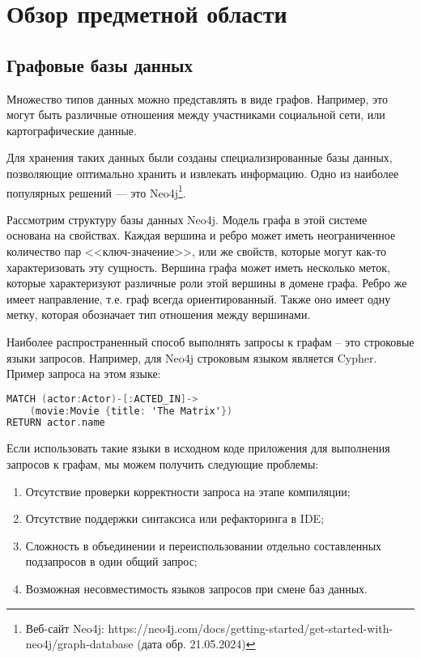 \chapter{Обзор предметной области}
\label{ch:ch1}

\section{Графовые базы данных}
Множество типов данных можно представлять в виде графов.
Например, это могут быть различные отношения между участниками социальной сети, или картографические данные.

Для хранения таких данных были созданы специализированные базы данных, позволяющие оптимально хранить и извлекать информацию. Одно из наиболее популярных решений --- это Neo4j\footnote{Веб-сайт Neo4j: https://neo4j.com/docs/getting-started/get-started-with-neo4j/graph-database (дата обр. 21.05.2024)}.

Рассмотрим структуру базы данных Neo4j.
Модель графа в этой системе основана на свойствах.
Каждая вершина и ребро может иметь неограниченное количество пар <<ключ-значение>>, или же свойств, которые могут как-то характеризовать эту сущность.
Вершина графа может иметь несколько меток, которые характеризуют различные роли этой вершины в домене графа.
Ребро же имеет направление, т.е. граф всегда ориентированный. Также оно имеет одну метку, которая обозначает тип отношения между вершинами.

Наиболее распространенный способ выполнять запросы к графам -- это строковые языки запросов.
Например, для Neo4j строковым языком является Cypher.
Пример запроса на этом языке:

\begin{nobreaks}
    \begin{lstlisting}[language=C]
MATCH (actor:Actor)-[:ACTED_IN]->
    (movie:Movie {title: 'The Matrix'})
RETURN actor.name
\end{lstlisting}
\end{nobreaks}

Если использовать такие языки в исходном коде приложения для выполнения запросов к графам, мы можем получить следующие проблемы:
\begin{enumerate}
    \item Отсутствие проверки корректности запроса на этапе компиляции;
    \item Отсутствие поддержки синтаксиса или рефакторинга в IDE;
    \item Сложность в объединении и переиспользовании отдельно составленных подзапросов в один общий запрос;
    \item Возможная несовместимость языков запросов при смене баз данных.
\end{enumerate}

